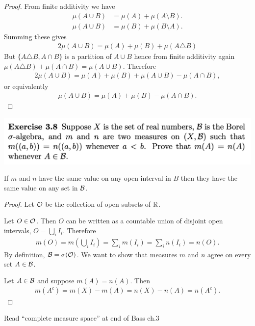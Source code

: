 \begin{proof}
  From finite additivity we have
  \begin{align*}
    \mu(A \cup B) &= \mu(A) + \mu(A \setminus B). \\
    \mu(A \cup B) &= \mu(B) + \mu(B \setminus A).
  \end{align*}
  Summing these gives
  \begin{align*}
    2\mu(A \cup B)
    = \mu(A) + \mu(B) + \mu(A \triangle B)
  \end{align*}
  But $\{A \triangle B, A \cap B\}$ is a partition of $A \cup B$ hence from finite additivity
  again $\mu(A \triangle B) + \mu(A \cap B) = \mu(A \cup B)$. Therefore
  \begin{align*}
    2\mu(A \cup B) = \mu(A) + \mu(B) + \mu(A \cup B) - \mu(A \cap B),
  \end{align*}
  or equivalently
  \begin{align*}
    \mu(A \cup B) = \mu(A) + \mu(B) - \mu(A \cap B).
  \end{align*}
\end{proof}

\newpage
\begin{mdframed}
\includegraphics[width=400pt]{img/analysis--berkeley-202a-hw-3a79.png}
\end{mdframed}

\begin{claim*}
  If $m$ and $n$ have the same value on any open interval in $B$ then they have the same value on any set
  in $\mathcal B$.
\end{claim*}

\begin{proof}
  Let $\mathcal O$ be the collection of open subsets of $\mathbb{R}$.

  Let $O \in \mathcal O$. Then $O$ can be written as a countable union of disjoint open intervals, $O = \bigcup_i I_i$. Therefore
  \begin{align*}
    m(O) = m(\bigcup_i I_i) = \sum_i m(I_i) = \sum_i n(I_i) = n(O).
  \end{align*}
   By definition, $\mathcal B = \sigma(\mathcal O)$. We want to show that measures $m$ and $n$ agree on every set $A \in \mathcal B$.

   Let $A \in \mathcal B$ and suppose $m(A) = n(A)$. Then
   \begin{align*}
     m(A^c) = m(X) - m(A) = n(X) - n(A) = n(A^c).
   \end{align*}




\end{proof}
Read ``complete measure space​'' at end of Bass ch.3

